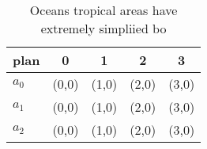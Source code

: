 \documentclass[a4paper]{article}
\begin{document}
\begin{table}
\begin{adjustbox}{width=0.5\columnwidth}
\begin{tabular}{|l|l|l|l|l|}
\hline
\textbf{plan} & \multicolumn{1}{c|}{\textbf{0}} & \multicolumn{1}{c|}{\textbf{1}} & \multicolumn{1}{c|}{\textbf{2}} & \multicolumn{1}{c|}{\textbf{3}} \\ \hline
\textbf{$a_0$}  & (0,0) & (1,0) & (2,0) & (3,0) \\ \hline
\textbf{$a_1$}  & (0,0) & (1,0) & (2,0) & (3,0) \\ \hline
\textbf{$a_2$}  & (0,0) & (1,0) & (2,0) & (3,0) \\ \hline
\end{tabular}
\end{adjustbox}
\caption{Oceans tropical areas have extremely simpliied bo
}
\end{table}
\end{document}
